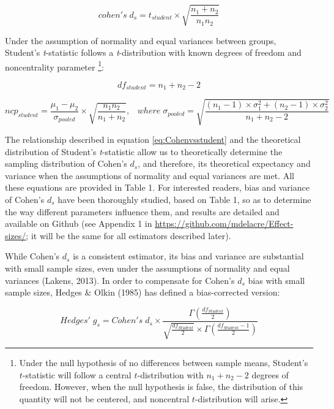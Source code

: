 \documentclass[
  man,floatsintext]{apa6}
\begin{document}
\begin{equation} 
cohen's \; d_s =  t_{student} \times \sqrt{\frac{n_1+n_2}{n_1n_2}}
\label{eq:Cohenvsstudent}
\end{equation}

Under the assumption of normality and equal variances between groups, Student's \emph{t}-statistic follows a \emph{t}-distribution with known degrees of freedom and noncentrality parameter \footnote{Under the null hypothesis of no differences between sample means, Student's $t$-statistic will follow a central $t$-distribution with $n_1+n_2-2$ degrees of freedom. However, when the null hypothesis is false, the distribution of this quantity will not be centered, and noncentral $t$-distribution will arise.}:

\begin{equation} 
df_{student} = n_1+n_2-2
\label{eq:studentdf}
\end{equation}

\begin{equation} 
ncp_{student} = \frac{\mu_1-\mu_2}{\sigma_{pooled}} \times \sqrt{\frac{n_1n_2}{n_1+n_2}}, \;\;\; where \; \sigma_{pooled}= \sqrt{\frac{(n_1-1) \times \sigma^2_1+(n_2-1) \times \sigma^2_2}{n_1+n_2-2}}
\label{eq:studentncp}
\end{equation}

The relationship described in equation \ref{eq:Cohenvsstudent} and the theoretical distribution of Student's \emph{t}-statistic allow us to theoretically determine the sampling distribution of Cohen's \(d_s\), and therefore, its theoretical expectancy and variance when the assumptions of normality and equal variances are met. All these equations are provided in Table 1. For interested readers, bias and variance of Cohen's \(d_s\) have been thoroughly studied, based on Table 1, so as to determine the way different parameters influence them, and results are detailed and available on Github (see Appendix 1 in \url{https://github.com/mdelacre/Effect-sizes/}; it will be the same for all estimators described later).

While Cohen's \(d_s\) is a consistent estimator, its bias and variance are substantial with small sample sizes, even under the assumptions of normality and equal variances (Lakens, 2013). In order to compensate for Cohen's \(d_s\) bias with small sample sizes, Hedges \& Olkin (1985) has defined a bias-corrected version:

\begin{equation} 
Hedges' \; g_s = Cohen's \; d_s \times \frac{\Gamma(\frac{df_{Student}}{2})}{\sqrt{\frac{df_{Student}}{2}} \times \Gamma(\frac{df_{Student}-1}{2})}
\label{eq:Hedgesgs}
\end{equation}
\end{document}
